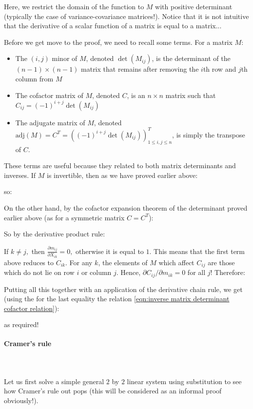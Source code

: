 	Here, we restrict the domain of the function to $M$ with positive determinant (typically the case of variance-covariance matrices!). Notice that it is not intuitive that the derivative of a scalar function of a matrix is equal to a matrix...
	
	Before we get move to the proof, we need to recall some terms. For a matrix $M$:
	\begin{itemize}
		\item The $(i,j)$ minor of $M$, denoted $\det(M_{ij})$, is the determinant of the $(n-1) \times (n-1)$ matrix that remains after removing the $i$th row and $j$th column from $M$
	
		\item The cofactor matrix of $M$, denoted $C$, is an $n \times n$ matrix such that $C_{ij} = (-1)^{i+j} \det(M_{ij})$
	
		\item The adjugate matrix of $M$, denoted $\text{adj}(M)=C^T=\left((-1)^{i+j}\det(M_{ij})\right)^T_{1\leq i,j\leq n}$, is simply the transpose of $C$.
	\end{itemize}
	These terms are useful because they related to both matrix determinants and inverses. If $M$ is invertible, then as we have proved earlier above:
	
	so\label{eqn:inverse matrix determinant cofactor relation}:
	
	On the other hand, by the cofactor expansion theorem of the determinant proved earlier above (as for a symmetric matrix $C=C^T$):
		
	So by the derivative product rule:
	
	If $k \neq j,$ then $\frac{\partial m_{ij}}{\partial X_{ik}}=0,$ otherwise it is equal to $1$. This means that the first term above reduces to $C_{ik}$. For any $k$, the elements of $M$ which affect $C_{ij}$ are those which do not lie on row $i$ or column $j$. Hence, $\partial C_{ij}/\partial m_{ik}=0$ for all $j$! Therefore:
	
	Putting all this together with an application of the derivative chain rule, we get (using the for the last equality the relation \ref{eqn:inverse matrix determinant cofactor relation}):
	
	as required!
	
	\paragraph{Cramer's rule}\label{Cramer's rule}\mbox{}\\\\
	Let us first solve a simple general $2$ by $2$ linear system using substitution to see how Cramer's rule out pops (this will be considered as an informal proof obviously!).


